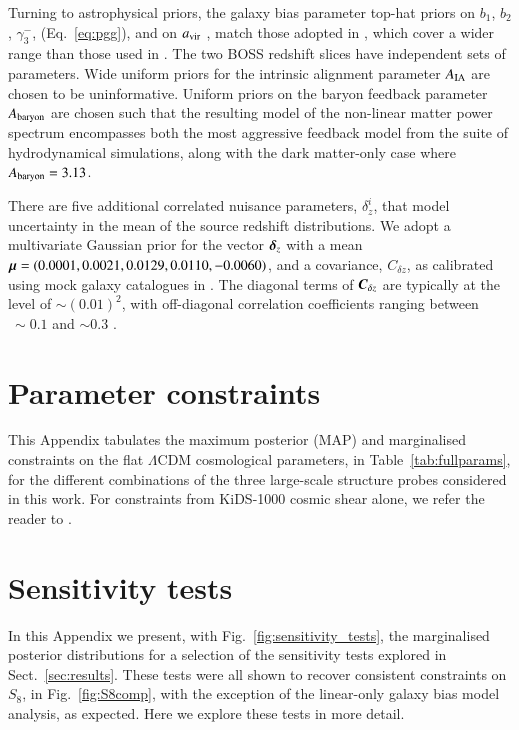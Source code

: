 \begin{appendix}
Turning to astrophysical priors, the galaxy bias parameter top-hat priors on $b_1$, $b_2$,  $\gamma_3^-$, (Eq.~\ref{eq:pgg}), and on $a_{\rm vir}$ \citep[see the `fingers of god' model in equations 6 to 9 of][]{joachimi/etal:inprep},
match those adopted in \citet{troester/etal:2020}, which cover a wider range than those used in \citet{sanchez/etal:2017}.  
The two BOSS redshift slices have independent sets of parameters.   
Wide uniform priors for the intrinsic alignment parameter $A_{\rm IA}$ are chosen to be uninformative.    
Uniform priors on the baryon feedback parameter $A_{\rm baryon}$ are chosen such that the resulting \citet{mead/etal:2015} model of the non-linear matter power spectrum encompasses both the most aggressive feedback model from the \citet{vandaalen/etal:2011} suite of hydrodynamical simulations, along with the dark matter-only case where $A_{\rm baryon}=3.13$.

There are five additional correlated nuisance parameters, $\delta^i_z$, that model uncertainty in the mean of the source redshift distributions.  We adopt a multivariate Gaussian prior for the vector $\mbox{\boldmath $\delta$}_z$ with a mean $\mbox{\boldmath $\mu$} = (0.0001,0.0021,0.0129,0.0110,-0.0060)$, and a covariance, $C_{\delta z}$, as calibrated using mock galaxy catalogues in \citet{wright/etal:2020}.   
The diagonal terms of $\mbox{\boldmath $C$}_{\delta z}$ are typically at the level of $\sim(0.01)^2$, with off-diagonal correlation coefficients ranging between $~\sim 0.1$ and $\sim 0.3$ \citep[see section 3 and figure 2 of][for details]{hildebrandt/etal:inprep}.


\section{Parameter constraints}
\label{app:parameter-constraints}
This Appendix tabulates the maximum posterior (MAP) and marginalised constraints on the flat $\Lambda$CDM cosmological parameters, in Table~\ref{tab:fullparams}, for the different combinations of the three large-scale structure probes considered in this work.   For constraints from KiDS-1000 cosmic shear alone, we refer the reader to \citet{asgari/etal:inprep}.


\section{Sensitivity tests}
\label{app:sensitivity}
In this Appendix we present, with Fig.~\ref{fig:sensitivity_tests}, the marginalised posterior distributions for a selection of the \tttp sensitivity tests explored in Sect.~\ref{sec:results}.  
These tests were all shown to recover consistent constraints on $S_8$, in Fig.~\ref{fig:S8comp}, with the exception of the linear-only galaxy bias model analysis, as expected.    
Here we explore these tests in more detail.    


\end{appendix}
